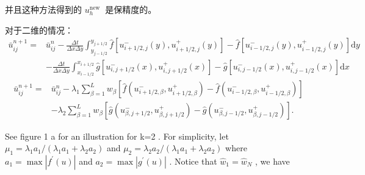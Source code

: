 \documentclass{article}
\numberwithin{equation}{subsection}    %
\begin{document}
并且这种方法得到的 $u_{h}^{\text {new }}$ 是保精度的。

对于二维的情况：
\begin{equation}
    \begin{aligned}
        \bar{u}_{i j}^{n+1}= & \bar{u}_{i j}^{n}-\frac{\Delta t}{\Delta x \Delta y} \int_{y_{j-1 / 2}}^{y_{j+1 / 2}} \hat{f}\left[u_{i+1 / 2, j}^{-}(y), u_{i+1 / 2, j}^{+}(y)\right]-\hat{f}\left[u_{i-1 / 2, j}^{-}(y), u_{i-1 / 2, j}^{+}(y)\right] \mathrm{d} y \\
                             & -\frac{\Delta t}{\Delta x \Delta y} \int_{x_{i-1 / 2}}^{x_{i+1 / 2}} \hat{g}\left[u_{i, j+1 / 2}^{-}(x), u_{i, j+1 / 2}^{+}(x)\right]-\hat{g}\left[u_{i, j-1 / 2}^{-}(x), u_{i, j-1 / 2}^{+}(x)\right] \mathrm{d} x
    \end{aligned}
\end{equation}
\begin{equation}
    \begin{aligned}
        \bar{u}_{i j}^{n+1}= & \bar{u}_{i j}^{n}-\lambda_{1} \sum_{\beta=1}^{L} w_{\beta}\left[\hat{f}\left(u_{i+1 / 2, \beta}^{-}, u_{i+1 / 2, \beta}^{+}\right)-\hat{f}\left(u_{i-1 / 2, \beta}^{-}, u_{i-1 / 2, \beta}^{+}\right)\right] \\
                             & -\lambda_{2} \sum_{\beta=1}^{L} w_{\beta}\left[\hat{g}\left(u_{\beta, j+1 / 2}^{-}, u_{\beta, j+1 / 2}^{+}\right)-\hat{g}\left(u_{\beta, j-1 / 2}^{-}, u_{\beta, j-1 / 2}^{+}\right)\right] .
    \end{aligned}
\end{equation}


See figure  1 a  for an illustration for  k=2 . For simplicity, let  $\mu_{1}=\lambda_{1} a_{1} /\left(\lambda_{1} a_{1}+\right.   \left.\lambda_{2} a_{2}\right)$  and  $\mu_{2}=\lambda_{2} a_{2} /\left(\lambda_{1} a_{1}+\lambda_{2} a_{2}\right) $ where  $a_{1}=\max \left|f^{\prime}(u)\right|$  and  $a_{2}=\max \left|g^{\prime}(u)\right|$ . Notice that  $\hat{w}_{1}=\hat{w}_{N}$ , we have
\end{document}
